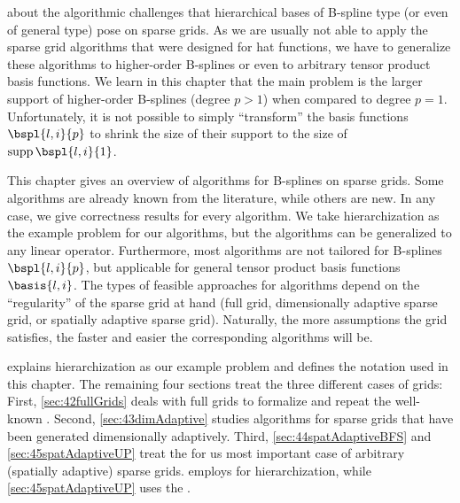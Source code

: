 


about the algorithmic challenges
that hierarchical bases of B-spline type (or even of general type) pose
on sparse grids.
As we are usually not able to apply the sparse grid algorithms
that were designed for hat functions, we have to generalize these algorithms
to higher-order B-splines or even to arbitrary tensor product basis functions.
We learn in this chapter that the main problem is the larger support
of higher-order B-splines (degree $p > 1$) when compared to degree $p = 1$.
Unfortunately, it is not possible to simply ``transform'' the basis
functions $\bspl{l,i}{p}$ to shrink the size of their support
to the size of $\supp \bspl{l,i}{1}$.

This chapter gives an overview of algorithms for B-splines
on sparse grids.
Some algorithms are already known from the literature,
while others are new.
In any case, we give correctness results for every algorithm.
We take hierarchization as the example problem for our algorithms,
but the algorithms can be generalized to any linear operator.
Furthermore, most algorithms are not tailored for B-splines $\bspl{l,i}{p}$,
but applicable for general tensor product basis functions $\basis{l,i}$.
The types of feasible approaches for algorithms
depend on the ``regularity'' of the sparse grid at hand
(full grid, dimensionally adaptive sparse grid, or
spatially adaptive sparse grid).
Naturally, the more assumptions the grid satisfies, the faster and
easier the corresponding algorithms will be.

 explains hierarchization as our example problem
and defines the notation used in this chapter.
The remaining four sections treat the three different cases of grids:
First, \cref{sec:42fullGrids} deals with full grids to formalize and repeat
the well-known \up.
Second, \cref{sec:43dimAdaptive} studies algorithms for
sparse grids that have been generated dimensionally adaptively.
Third, \cref{sec:44spatAdaptiveBFS} and \cref{sec:45spatAdaptiveUP}
treat the for us most important case
of arbitrary (spatially adaptive) sparse grids.
 employs \bfs for hierarchization,
while \cref{sec:45spatAdaptiveUP} uses the \up.


